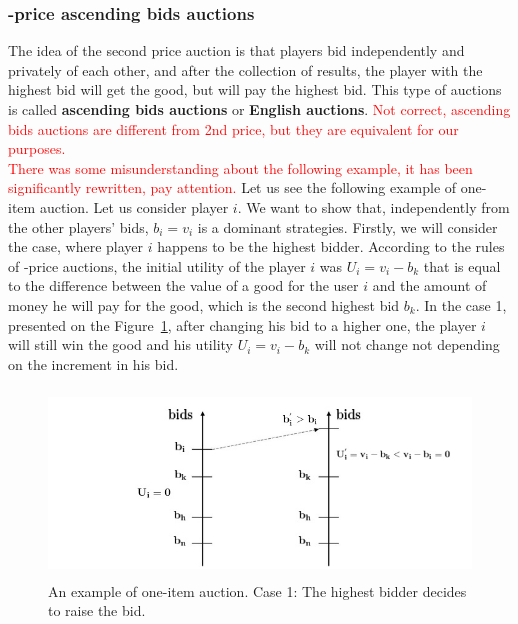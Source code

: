 \documentclass{article}
\begin{document}
\subsubsection{-price ascending bids auctions } The idea of the second price auction is that players bid independently and privately of each other, and after the collection of results, the player with the highest bid will get the good, but will pay the  highest bid. This type of auctions is called \textbf{ascending bids auctions} or \textbf{English auctions}. \textcolor{red}{Not correct, ascending bids auctions are different from 2nd price, but they are equivalent for our purposes.} \\
\textcolor{red}{There was some misunderstanding about the following example, it has been significantly rewritten, pay attention.}
Let us see the following example of one-item auction. Let us consider player $i$. We want to show that, independently from the other players' bids, $b_i=v_i$ is a dominant strategies. Firstly, we will consider the case, where player $i$ happens to be the highest bidder. According to the rules of -price auctions, the initial utility of the player $i$ was $U_i=v_i-b_k$ that is equal to the difference between the value of a good for the user $i$ and the amount of money he will pay for the good, which is the second highest bid $b_k$. In the case 1, presented on the Figure~\ref{fig:bids1}, after changing his bid to a higher one, the player $i$ will still win the good and his utility $U_i=v_i-b_k$ will not change not depending on the increment in his bid. 
\begin{figure}
	[!hbt] 
	\begin{center}
		\includegraphics[height=5cm]{img7.jpg} \caption{An example of one-item auction. Case 1: The highest bidder decides to raise the bid.} \label{fig:bids1} 
	\end{center}
\end{figure}
\end{document}
